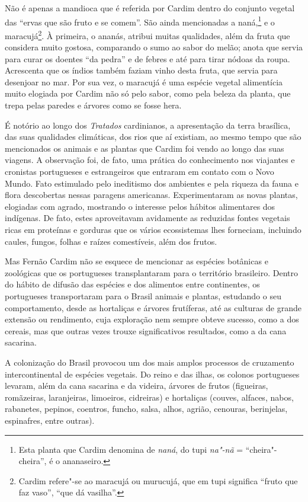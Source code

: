  Não é apenas a mandioca que é referida por Cardim dentro do
conjunto vegetal das ``ervas que são fruto e se comem''. São
ainda mencionadas a naná,\footnote{ Esta planta que Cardim
denomina de \textit{naná}, do tupi \textit{na"-nã} = ``cheira"-cheira'', é
o ananaseiro.} e o maracujá\footnote{ Cardim
refere"-se ao maracujá ou murucujá, que em tupi
significa ``fruto que faz vaso'', ``que dá vasilha''.}. À
primeira, o ananás, atribui muitas qualidades, além da fruta que
considera muito gostosa, comparando o sumo ao sabor do melão; anota que
servia para curar os doentes ``da pedra'' e de febres e até para tirar
nódoas da roupa. Acrescenta que os índios também faziam vinho desta
fruta, que servia para desenjoar no mar. Por sua vez, o maracujá é uma
espécie vegetal alimentícia muito elogiada por Cardim não só pelo
sabor, como pela beleza da planta, que trepa pelas paredes e árvores como se fosse hera. 

 É notório ao longo dos \textit{Tratados} cardinianos, a
apresentação da terra brasílica, das suas qualidades climáticas, dos
rios que aí existiam, ao mesmo tempo que são mencionados os animais e
as plantas que Cardim foi vendo ao longo das suas viagens. A observação
foi, de fato, uma prática do conhecimento nos viajantes e cronistas
portugueses e estrangeiros que entraram em contato com o Novo
Mundo. Fato estimulado pelo ineditismo dos ambientes e pela riqueza
da fauna e flora descobertas nessas paragens americanas. Experimentaram
as novas plantas, elogiadas com agrado, mostrando o interesse pelos
hábitos alimentares dos indígenas. De fato, estes aproveitavam
avidamente as reduzidas fontes vegetais ricas em proteínas e gorduras
que os vários ecossistemas lhes forneciam, incluindo caules, fungos,
folhas e raízes comestíveis, além dos frutos.

Mas Fernão Cardim não se esquece de mencionar as espécies botânicas
e zoológicas que os portugueses transplantaram para o território
brasileiro. Dentro do hábito de difusão das espécies e dos alimentos
entre continentes, os portugueses transportaram para o Brasil animais e
plantas, estudando o seu comportamento, desde as hortaliças e árvores
frutíferas, até as culturas de grande extensão ou rendimento, cuja
exploração nem sempre obteve sucesso, como a dos cereais, mas que
outras vezes trouxe significativos resultados, como a da cana sacarina.

A colonização do Brasil provocou um dos mais amplos processos de
cruzamento intercontinental de espécies vegetais. Do reino e das ilhas,
os colonos portugueses levaram, além da cana sacarina e da videira,
árvores de frutos (figueiras, romãzeiras, laranjeiras, limoeiros,
cidreiras) e hortaliças (couves, alfaces, nabos, rabanetes, pepinos,
coentros, funcho, salsa, alhos, agrião, cenouras, berinjelas,
espinafres, entre outras). 

